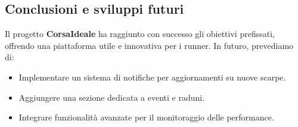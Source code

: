 \documentclass[a4paper, 12pt]{article}
\begin{document}
\begin{justify}
\section{Conclusioni e sviluppi futuri}
Il progetto \textbf{CorsaIdeale} ha raggiunto con successo gli obiettivi prefissati, offrendo una piattaforma utile e innovativa per i runner. In futuro, prevediamo di:
\begin{itemize}
    \item Implementare un sistema di notifiche per aggiornamenti su nuove scarpe.
    \item Aggiungere una sezione dedicata a eventi e raduni.
    \item Integrare funzionalit\`a avanzate per il monitoraggio delle performance.
\end{itemize}

\vspace{1cm}


\end{justify}
\end{document}
